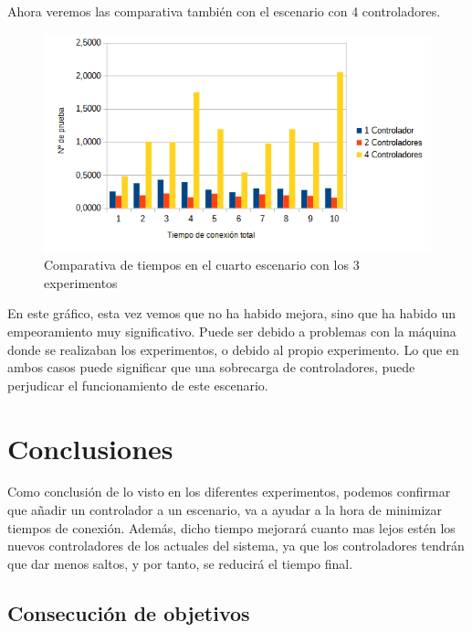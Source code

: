 \documentclass[a4paper, 12pt]{book}
\begin{document}
	
	Ahora veremos las comparativa también con el escenario con 4 controladores.
	
	\begin{figure}[H]
		\centering
		\includegraphics[width=16cm, keepaspectratio]{img/comparativaFail}
		\caption{Comparativa de tiempos en el cuarto escenario con los 3 experimentos}
		\label{figura:comparativaFail}
	\end{figure}
	
	En este gráfico, esta vez vemos que no ha habido mejora, sino que ha habido un empeoramiento muy  significativo. Puede ser debido a problemas con la máquina donde se realizaban los experimentos, o debido al propio experimento. Lo que en ambos casos puede significar que una sobrecarga de controladores, puede perjudicar el funcionamiento de este escenario.
	
	
	
	\clearpage
	\chapter{Conclusiones}
	\label{chap:conclusiones}
	
	Como conclusión de lo visto en los diferentes experimentos, podemos confirmar que añadir un controlador a un escenario, va a ayudar a la hora de minimizar tiempos de conexión. Además, dicho tiempo mejorará cuanto mas lejos estén los nuevos controladores de los actuales del sistema, ya que los controladores tendrán que dar menos saltos, y por tanto, se reducirá el tiempo final. 
	
	\section{Consecución de objetivos}
	\label{sec:consecucion-objetivos}
	
\end{document}
